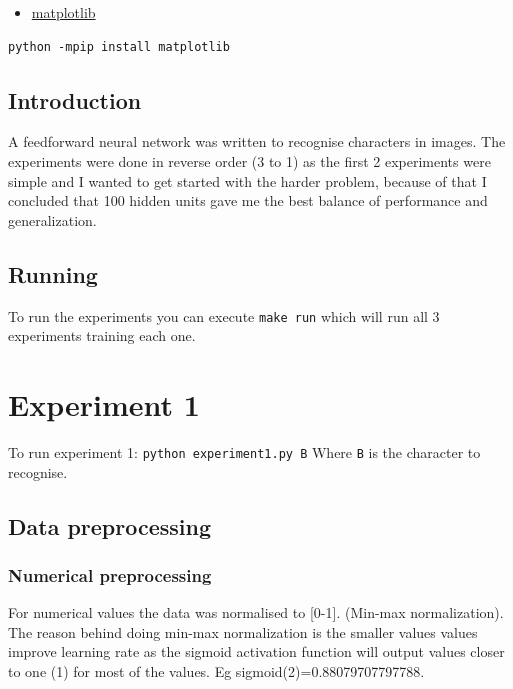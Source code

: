 \documentclass[11pt]{article}
\providecommand{\tightlist}{%
      \setlength{\itemsep}{0pt}\setlength{\parskip}{0pt}}
\begin{document}
\begin{itemize}
\tightlist
\item
  \href{https://matplotlib.org/}{matplotlib}
\end{itemize}

\begin{verbatim}
python -mpip install matplotlib
\end{verbatim}

\hypertarget{introduction}{%
\subsection{Introduction}\label{introduction}}

A feedforward neural network was written to recognise characters in
images. The experiments were done in reverse order (3 to 1) as the first
2 experiments were simple and I wanted to get started with the harder
problem, because of that I concluded that 100 hidden units gave me the
best balance of performance and generalization.

\hypertarget{running}{%
\subsection{Running}\label{running}}

To run the experiments you can execute \texttt{make\ run} which will run
all 3 experiments training each one.

    \hypertarget{experiment-1}{%
\section{Experiment 1}\label{experiment-1}}

To run experiment 1: \texttt{python\ experiment1.py\ B} Where \texttt{B}
is the character to recognise.

\hypertarget{data-preprocessing}{%
\subsection{Data preprocessing}\label{data-preprocessing}}

\hypertarget{numerical-preprocessing}{%
\subsubsection{Numerical preprocessing}\label{numerical-preprocessing}}

For numerical values the data was normalised to {[}0-1{]}. (Min-max
normalization). The reason behind doing min-max normalization is the
smaller values values improve learning rate as the sigmoid activation
function will output values closer to one (1) for most of the values. Eg
sigmoid(2)=0.88079707797788.
\end{document}
